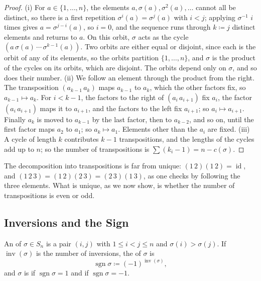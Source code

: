 \begin{proof}
(i) For $a\in\{1,\ldots,n\}$, the elements $a,\sigma(a),\sigma^2(a),\ldots$ cannot all be distinct, so there is a first repetition $\sigma^i(a)=\sigma^j(a)$ with $i<j$; applying $\sigma^{-1}$ $i$ times gives $a=\sigma^{j-i}(a)$, so $i=0$, and the sequence runs through $k\coloneqq j$ distinct elements and returns to $a$. On this orbit, $\sigma$ acts as the cycle $(a\,\sigma(a)\,\cdots\,\sigma^{k-1}(a))$. Two orbits are either equal or disjoint, since each is the orbit of any of its elements, so the orbits partition $\{1,\ldots,n\}$, and $\sigma$ is the product of the cycles on its orbits, which are disjoint. The orbits depend only on $\sigma$, and so does their number. (ii) We follow an element through the product from the right. The transposition $(a_{k-1}\,a_k)$ maps $a_{k-1}$ to $a_k$, which the other factors fix, so $a_{k-1}\mapsto a_k$. For $i<k-1$, the factors to the right of $(a_i\,a_{i+1})$ fix $a_i$, the factor $(a_i\,a_{i+1})$ maps it to $a_{i+1}$, and the factors to the left fix $a_{i+1}$; so $a_i\mapsto a_{i+1}$. Finally $a_k$ is moved to $a_{k-1}$ by the last factor, then to $a_{k-2}$, and so on, until the first factor maps $a_2$ to $a_1$; so $a_k\mapsto a_1$. Elements other than the $a_i$ are fixed. (iii) A cycle of length $k$ contributes $k-1$ transpositions, and the lengths of the cycles add up to $n$; so the number of transpositions is $\sum(k_i-1)=n-c(\sigma)$.
\end{proof}

The decomposition into transpositions is far from unique: $(1\,2)(1\,2)=\operatorname{id}$, and $(1\,2\,3)=(1\,2)(2\,3)=(2\,3)(1\,3)$, as one checks by following the three elements. What is unique, as we now show, is whether the number of transpositions is even or odd.

\subsection{Inversions and the Sign}

\begin{definition}
\label{def:sign-permutation}
An  of $\sigma\in S_n$ is a pair $(i,j)$ with $1\le i<j\le n$ and $\sigma(i)>\sigma(j)$. If $\operatorname{inv}(\sigma)$ is the number of inversions, the  of $\sigma$ is
\[
\operatorname{sgn}\sigma\coloneqq(-1)^{\operatorname{inv}(\sigma)},
\]
and $\sigma$ is  if $\operatorname{sgn}\sigma=1$ and  if $\operatorname{sgn}\sigma=-1$.
\end{definition}

